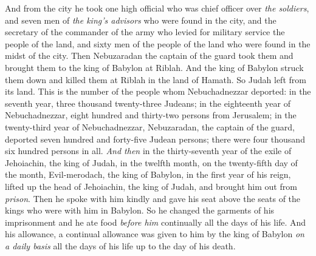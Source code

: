 \begin{biblechapter}
\verse And from the city he took one high official who was chief officer over \textit{the soldiers}, and seven men of \textit{the king’s advisors} who were found in the city, and the secretary of the commander of the army who levied for military service the people of the land, and sixty men of the people of the land who were found in the midst of the city.
\verse Then Nebuzaradan the captain of the guard took them and brought them to the king of Babylon at Riblah.
\verse And the king of Babylon struck them down and killed them at Riblah in the land of Hamath. So Judah left from its land.
\verse This is the number of the people whom Nebuchadnezzar deported: in the seventh year, three thousand twenty-three Judeans;
\verse in the eighteenth year of Nebuchadnezzar, eight hundred and thirty-two persons from Jerusalem;
\verse in the twenty-third year of Nebuchadnezzar, Nebuzaradan, the captain of the guard, deported seven hundred and forty-five Judean persons; there were four thousand six hundred persons in all.
 \textit{And then} in the thirty-seventh year of the exile of Jehoiachin, the king of Judah, in the twelfth month, on the twenty-fifth day of the month, Evil-merodach, the king of Babylon, in the first year of his reign, lifted up the head of Jehoiachin, the king of Judah, and brought him out from \textit{prison}.
\verse Then he spoke with him kindly and gave his seat above the seats of the kings who were with him in Babylon.
\verse So he changed the garments of his imprisonment and he ate food \textit{before him} continually all the days of his life.
\verse And his allowance, a continual allowance was given to him by the king of Babylon \textit{on a daily basis} all the days of his life up to the day of his death.
\end{biblechapter}


